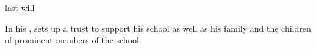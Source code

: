 \documentclass{stex}
\begin{document}
\begin{smodule}{last-will}
\begin{sparagraph}[style=symdoc]
In his ,  sets up a trust to support his school as well as his family and the children of prominent members of the school.
\end{sparagraph}
\end{smodule}
\end{document}
